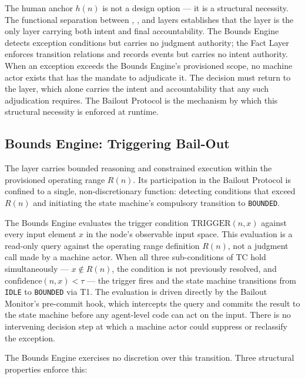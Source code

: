The human anchor $h(n)$ is not a design option — it is a structural necessity. The functional separation between \purpose{}, \bounds{}, and \fact{} layers establishes that the \purpose{} layer is the only layer carrying both intent and final accountability. The Bounds Engine detects exception conditions but carries no judgment authority; the Fact Layer enforces transition relations and records events but carries no intent authority. When an exception exceeds the Bounds Engine's provisioned scope, no machine actor exists that has the mandate to adjudicate it. The decision must return to the \purpose{} layer, which alone carries the intent and accountability that any such adjudication requires. The Bailout Protocol is the mechanism by which this structural necessity is enforced at runtime.

\subsection{Bounds Engine: Triggering Bail-Out}\label{sec:bounds-trigger}

The \bounds{} layer carries bounded reasoning and constrained execution within the provisioned operating range $R(n)$. Its participation in the Bailout Protocol is confined to a single, non-discretionary function: detecting conditions that exceed $R(n)$ and initiating the state machine's compulsory transition to \texttt{BOUNDED}.

The Bounds Engine evaluates the trigger condition $\text{TRIGGER}(n, x)$ against every input element $x$ in the node's observable input space. This evaluation is a read-only query against the operating range definition $R(n)$, not a judgment call made by a machine actor. When all three sub-conditions of TC hold simultaneously — $x \notin R(n)$, the condition is not previously resolved, and $\text{confidence}(n, x) < \tau$ — the trigger fires and the state machine transitions from \texttt{IDLE} to \texttt{BOUNDED} via T1. The evaluation is driven directly by the Bailout Monitor's pre-commit hook, which intercepts the query and commits the result to the state machine before any agent-level code can act on the input. There is no intervening decision step at which a machine actor could suppress or reclassify the exception.

The Bounds Engine exercises no discretion over this transition. Three structural properties enforce this:

